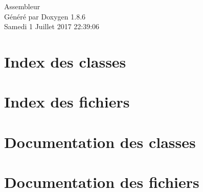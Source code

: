 \documentclass[twoside]{book}
\newcommand{\clearemptydoublepage}{%
  \newpage{\pagestyle{empty}\cleardoublepage}%
}
\begin{document}
\hypersetup{pageanchor=false}
\begin{titlepage}
\vspace*{7cm}
\begin{center}%
{\Large Assembleur }\\
\vspace*{1cm}
{\large Généré par Doxygen 1.8.6}\\
\vspace*{0.5cm}
{\small Samedi 1 Juillet 2017 22:39:06}\\
\end{center}
\end{titlepage}
\clearemptydoublepage
\tableofcontents
\clearemptydoublepage
{}
\hypersetup{pageanchor=true}

\chapter{Index des classes}

\chapter{Index des fichiers}

\chapter{Documentation des classes}









\chapter{Documentation des fichiers}



\newpage
{}
{}
\printindex
\end{document}

